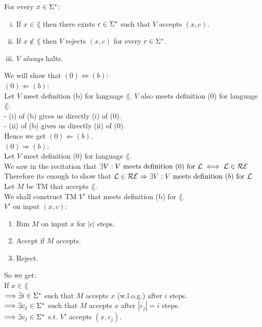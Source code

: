 For every $x \in \Sigma^*$:
\begin{enumerate}[(i)]
    \item If $x \in \lang$ then there exists $c \in \Sigma^*$ such that $V$ accepts $(x, c)$.
    \item If $x \notin \lang$ then $V$ rejects $(x, c)$ for every $c \in \Sigma^*$.
    \item $V$ \textit{always} halts.
\end{enumerate}

We will show that $(0) \iff (b)$: \\

\underline{$(0) \Leftarrow (b)$}: \\
Let $V$ meet definition (b) for language $\lang$. $V$ also meets definition (0) for language $\lang$: \\
- (i) of (b) gives us directly (i) of (0). \\
- (ii) of (b) gives us directly (ii) of (0). \\
Hence we get $(0) \Leftarrow (b)$. \\

\underline{$(0) \Rightarrow (b)$}: \\
Let $V$ meet definition (0) for language $\lang$. \\
We saw in the recitation that $\exists V: V \text{ meets definition } (0) \text{ for } \mathcal{L} \iff \mathcal{L} \in \mathcal{R}\mathcal{E}$ \\
Therefore its enough to show that $\mathcal{L} \in \mathcal{R}\mathcal{E} \Rightarrow \exists V: V \text{ meets definition } (b) \text{ for } \mathcal{L}$  \\
Let $M$ be TM that accepts $\lang$. \\
We shall construct TM $V'$ that meets definition (b) for $\lang$. \\
$V'$ on input $(x, c)$:
\begin{enumerate}[1., itemsep=5pt]
    \item Run $M$ on input $x$ for $|c|$ steps.
    \item Accept if $M$ accepts.
    \item Reject.
\end{enumerate}

So we get: \\
If $x \in \lang$ \\
$\Longrightarrow \exists i \in \Sigma^*$ such that $M$ accepts $x$ (w.l.o.g.) after $i$ steps. \\
$\Longrightarrow \exists c_j \in \Sigma^*$ such that $M$ accepts $x$ after $|c_j|=i$ steps. \\
$\Longrightarrow \exists c_j \in \Sigma^*$ s.t. $V'$ accepts $(x, c_j)$. \\

